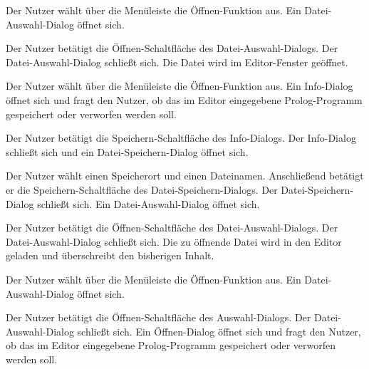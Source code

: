 \documentclass[parskip=full,11pt,twoside]{scrartcl}
\begin{document}

{Der Nutzer wählt über die Menüleiste die Öffnen-Funktion aus.}
{Ein Datei-Auswahl-Dialog öffnet sich.}

{Der Nutzer betätigt die Öffnen-Schaltfläche des Datei-Auswahl-Dialogs.}
{Der Datei-Auswahl-Dialog schließt sich. Die Datei wird im Editor-Fenster geöffnet.}


{Der Nutzer wählt über die Menüleiste die Öffnen-Funktion aus.}
{Ein Info-Dialog öffnet sich und fragt den Nutzer, ob das im Editor eingegebene Prolog-Programm gespeichert oder verworfen werden soll.}

{Der Nutzer betätigt die Speichern-Schaltfläche des Info-Dialogs.}
{Der Info-Dialog schließt sich und ein Datei-Speichern-Dialog öffnet sich.}

{Der Nutzer wählt einen Speicherort und einen Dateinamen. Anschließend betätigt er die Speichern-Schaltfläche des Datei-Speichern-Dialogs.}
{Der Datei-Speichern-Dialog schließt sich. Ein Datei-Auswahl-Dialog öffnet sich.}

{Der Nutzer betätigt die Öffnen-Schaltfläche des Datei-Auswahl-Dialogs.}
{Der Datei-Auswahl-Dialog schließt sich. Die zu öffnende Datei wird in den Editor geladen und überschreibt den bisherigen Inhalt.}


{Der Nutzer wählt über die Menüleiste die Öffnen-Funktion aus.}
{Ein Datei-Auswahl-Dialog öffnet sich.}

{Der Nutzer betätigt die Öffnen-Schaltfläche des Auswahl-Dialogs.}
{Der Datei-Auswahl-Dialog schließt sich. Ein Öffnen-Dialog öffnet sich und fragt den Nutzer, ob das im Editor eingegebene Prolog-Programm gespeichert oder verworfen werden soll.}
\end{document}
